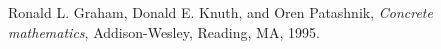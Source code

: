 \begin{thebibliography}{9}
Ronald L. Graham, Donald E. Knuth, and Oren Patashnik,
\textit{Concrete mathematics},
Addison-Wesley, Reading, MA, 1995.
\end{thebibliography}

